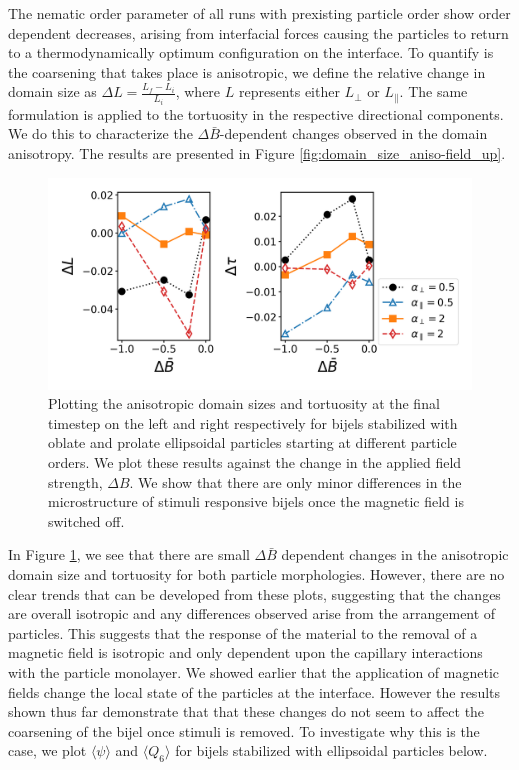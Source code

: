 The nematic order parameter of all runs with prexisting particle order
show order dependent decreases, arising from interfacial forces causing
the particles to return to a thermodynamically optimum configuration on
the interface. To quantify is the coarsening that takes place is
anisotropic, we define the relative change in domain size as
\(\Delta L = \frac{L_{f} - L_{i}}{L_{i}}\), where \(L\) represents
either \(L_{\perp}\) or \(L_{\parallel}\). The same formulation is
applied to the tortuosity in the respective directional components. We
do this to characterize the \(\Delta \bar{B}\)-dependent changes
observed in the domain anisotropy. The results are presented in Figure
\ref{fig:domain_size_aniso-field_up}.

\begin{figure} 
\centering 
\includegraphics[scale = 0.5]{../figures/results/paper2/domain_size_aniso-field_down.png} 
\caption{Plotting the anisotropic domain sizes and tortuosity at the final timestep on the left and right respectively for bijels stabilized with oblate and prolate ellipsoidal particles starting at different particle orders. We plot these results against the change in the applied field strength, $\Delta B$. We show that there are only minor differences in the microstructure of stimuli responsive bijels once the magnetic field is switched off.} 
\label{fig:domain_size_aniso-field_down} 
\end{figure}

In Figure \ref{fig:domain_size_aniso-field_down}, we see that there are
small \(\Delta \bar{B}\) dependent changes in the anisotropic domain
size and tortuosity for both particle morphologies. However, there are
no clear trends that can be developed from these plots, suggesting that
the changes are overall isotropic and any differences observed arise
from the arrangement of particles. This suggests that the response of
the material to the removal of a magnetic field is isotropic and only
dependent upon the capillary interactions with the particle monolayer.
We showed earlier that the application of magnetic fields change the
local state of the particles at the interface. However the results shown
thus far demonstrate that that these changes do not seem to affect the
coarsening of the bijel once stimuli is removed. To investigate why this
is the case, we plot \(\langle \psi \rangle\) and
\(\langle Q_6 \rangle\) for bijels stabilized with ellipsoidal particles
below.

